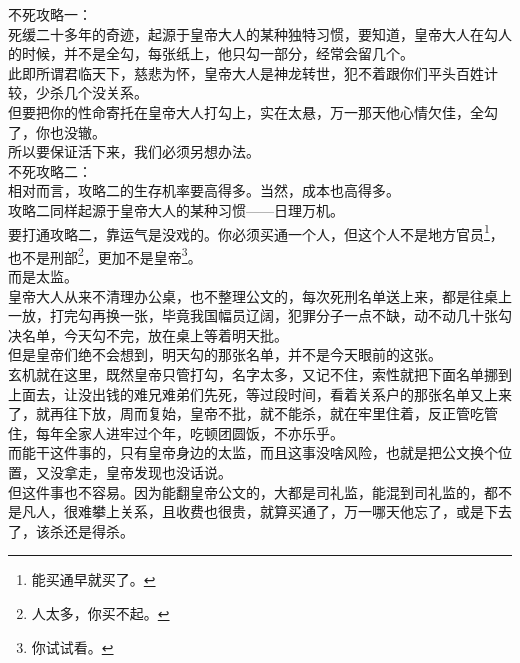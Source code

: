 \begin{multicols}{\theparacolNo}
不死攻略一：\\

死缓二十多年的奇迹，起源于皇帝大人的某种独特习惯，要知道，皇帝大人在勾人的时候，并不是全勾，每张纸上，他只勾一部分，经常会留几个。\\

此即所谓君临天下，慈悲为怀，皇帝大人是神龙转世，犯不着跟你们平头百姓计较，少杀几个没关系。\\

但要把你的性命寄托在皇帝大人打勾上，实在太悬，万一那天他心情欠佳，全勾了，你也没辙。\\

所以要保证活下来，我们必须另想办法。\\

不死攻略二：\\

相对而言，攻略二的生存机率要高得多。当然，成本也高得多。\\

攻略二同样起源于皇帝大人的某种习惯——日理万机。\\

要打通攻略二，靠运气是没戏的。你必须买通一个人，但这个人不是地方官员\footnote{能买通早就买了。}，也不是刑部\footnote{人太多，你买不起。}，更加不是皇帝\footnote{你试试看。}。\\

而是太监。\\

皇帝大人从来不清理办公桌，也不整理公文的，每次死刑名单送上来，都是往桌上一放，打完勾再换一张，毕竟我国幅员辽阔，犯罪分子一点不缺，动不动几十张勾决名单，今天勾不完，放在桌上等着明天批。\\

但是皇帝们绝不会想到，明天勾的那张名单，并不是今天眼前的这张。\\

玄机就在这里，既然皇帝只管打勾，名字太多，又记不住，索性就把下面名单挪到上面去，让没出钱的难兄难弟们先死，等过段时间，看着关系户的那张名单又上来了，就再往下放，周而复始，皇帝不批，就不能杀，就在牢里住着，反正管吃管住，每年全家人进牢过个年，吃顿团圆饭，不亦乐乎。\\

而能干这件事的，只有皇帝身边的太监，而且这事没啥风险，也就是把公文换个位置，又没拿走，皇帝发现也没话说。\\

但这件事也不容易。因为能翻皇帝公文的，大都是司礼监，能混到司礼监的，都不是凡人，很难攀上关系，且收费也很贵，就算买通了，万一哪天他忘了，或是下去了，该杀还是得杀。\\


\end{multicols}
